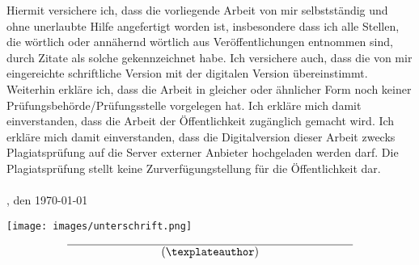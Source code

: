 \newpage
\pagestyle{empty}
Hiermit versichere ich, dass die vorliegende Arbeit von mir selbstständig und ohne unerlaubte Hilfe angefertigt worden ist, insbesondere dass ich alle Stellen, die wörtlich oder annähernd wörtlich aus Veröffentlichungen entnommen sind, durch Zitate als solche gekennzeichnet habe. Ich versichere auch, dass die von mir eingereichte schriftliche Version mit der digitalen Version übereinstimmt. Weiterhin erkläre ich, dass die Arbeit in gleicher oder ähnlicher Form noch keiner Prüfungsbehörde/Prüfungsstelle vorgelegen hat. Ich erkläre mich damit einverstanden, dass die Arbeit der Öffentlichkeit zugänglich gemacht wird. Ich erkläre mich damit einverstanden, dass die Digitalversion dieser Arbeit zwecks Plagiatsprüfung auf die Server externer Anbieter hochgeladen werden darf. Die Plagiatsprüfung stellt keine Zurverfügungstellung für die Öffentlichkeit dar.
\\
\\
\noindent \texplatelocation, den \today
\begin{flushright}
\texttt{[image: images/unterschrift.png]}\hspace*{+21mm}

\vspace{-2mm}
$$\overline{~~~~~~~~~~~~~~~~~~~~~~~~~\mbox{(\texplateauthor)}~~~~~~~~~~~~~~~~~~~~~~~~~}$$
\end{flushright}
